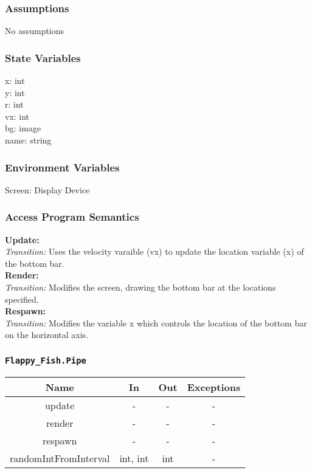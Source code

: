 \documentclass[11pt, oneside]{article}   	%
\begin{document}
\subsubsection{Assumptions}
No assumptions

\subsubsection{State Variables}
x: int\\
y: int\\
r: int\\
vx: int \\
bg: image \\
name: string\\
\subsubsection{Environment Variables}
Screen: Display Device


\subsubsection{Access Program Semantics} 
 \textbf{Update:}  \\
 \textit{Transition:} Uses the velocity varaible (vx) to update the location variable (x) of the bottom bar.\\
 \textbf{Render:}  \\
 \textit{Transition:} Modifies the screen, drawing the bottom bar at the locations specified.\\
 \textbf{Respawn:}  \\
 \textit{Transition:} Modifies the variable x which controls the location of the bottom bar on the horizontal axis.\\


\subsubsection{\texttt{Flappy\_Fish.Pipe}}



\begin{center}
\begin{tabular}{ |c|c|c|c| } 
 \hline
 Name & In & Out & Exceptions \\ 
 \hline \hline
 update &-  & - & - \\ 
render & - & - & - \\ 
respawn & - & - & - \\ 
randomIntFromInterval & int, int & int & - \\
 \hline
\end{tabular}
\end{center}
\end{document}
